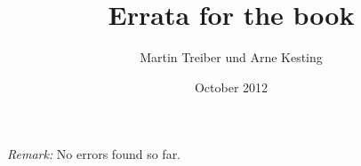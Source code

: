 \documentclass[11pt,a4paper]{scrartcl}
\title{Errata for the book\\\gquote{Traffic Flow Dynamics}}
\author{Martin Treiber und Arne Kesting}
\date{October 2012}
\providecommand{\gquote}[1]{`#1'}
\providecommand{\abl}[2]   {\frac{\D #1}{\D #2}}  %
\renewcommand{\abl}[2]{\frac{{\rm d} #1}{{\rm d} #2}}  %
\providecommand{\3}{{\ss}}
\begin{document}
\maketitle

\emph{Remark:}
No errors found so far.

\end{document}
